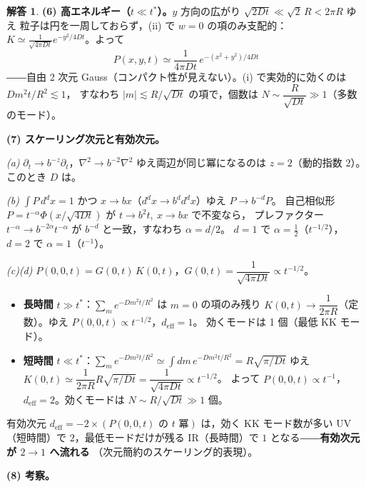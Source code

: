 \documentclass[dvipdfmx, uplatex]{jsarticle}
\theoremstyle{definition}
\newtheorem*{sol}{解答}
\begin{document}
\begin{sol}
\par\smallskip
\textbf{(6) 高エネルギー（$t\ll t^\ast$）。}$y$ 方向の広がり $\sqrt{2Dt}\ll\sqrt{2}\,R<2\pi R$ ゆえ
粒子は円を一周しておらず，(ii) で $\boxed{w=0}$ の項のみ支配的：
$K\simeq\frac{1}{\sqrt{4\pi Dt}}e^{-y^2/4Dt}$。よって
\[
    \boxed{\,P(x,y,t)\simeq\frac{1}{4\pi Dt}\,e^{-(x^2+y^2)/4Dt}\,}
\]
――自由 2 次元 Gauss（コンパクト性が見えない）。(i) で実効的に効くのは $Dm^2t/R^2\lesssim1$，
すなわち $|m|\lesssim R/\sqrt{Dt}$ の項で，個数は $\boxed{N\sim\dfrac{R}{\sqrt{Dt}}\gg1}$（多数のモード）。

\par\smallskip
\textbf{(7) スケーリング次元と有効次元。}

\textit{(a)} $\partial_t\to b^{-z}\partial_t$，$\nabla^2\to b^{-2}\nabla^2$ ゆえ両辺が同じ冪になるのは
$\boxed{z=2}$（動的指数 $2$）。このとき $D$ は。

\textit{(b)} $\int P\,d^dx=1$ かつ $x\to bx$（$d^dx\to b^d d^dx$）ゆえ $\boxed{P\to b^{-d}P}$。
自己相似形 $P=t^{-\alpha}\Phi(x/\sqrt{4Dt})$ が $t\to b^2t,\ x\to bx$ で不変なら，
プレファクター $t^{-\alpha}\to b^{-2\alpha}t^{-\alpha}$ が $b^{-d}$ と一致，すなわち $\boxed{\alpha=d/2}$。
$d=1$ で $\alpha=\tfrac12$（$t^{-1/2}$），$d=2$ で $\alpha=1$（$t^{-1}$）。

\textit{(c)(d)} $P(0,0,t)=G(0,t)\,K(0,t)$，$G(0,t)=\dfrac{1}{\sqrt{4\pi Dt}}\propto t^{-1/2}$。
\begin{itemize}
\item[$\bullet$] \textbf{長時間} $t\gg t^\ast$：$\sum_m e^{-Dm^2t/R^2}$ は $\boxed{m=0}$ の項のみ残り
$K(0,t)\to\dfrac{1}{2\pi R}$（定数）。ゆえ $P(0,0,t)\propto\boxed{t^{-1/2}}$，$\boxed{d_{\mathrm{eff}}=1}$。
効くモードは 1 個（最低 KK モード）。
\item[$\bullet$] \textbf{短時間} $t\ll t^\ast$：$\displaystyle\sum_m e^{-Dm^2t/R^2}\simeq\int dm\,e^{-Dm^2t/R^2}
=R\sqrt{\pi/Dt}$ ゆえ $K(0,t)\simeq\dfrac{1}{2\pi R}R\sqrt{\pi/Dt}=\dfrac{1}{\sqrt{4\pi Dt}}\propto t^{-1/2}$。
よって $P(0,0,t)\propto\boxed{t^{-1}}$，$\boxed{d_{\mathrm{eff}}=2}$。効くモードは $N\sim R/\sqrt{Dt}\gg1$ 個。
\end{itemize}
有効次元 $d_{\mathrm{eff}}=-2\times(\text{$P(0,0,t)$ の $t$ 冪})$ は，効く KK モード数が多い UV（短時間）で
$2$，最低モードだけが残る IR（長時間）で $1$ となる――\textbf{有効次元が $2\to1$ へ流れる}
（次元簡約のスケーリング的表現）。

\par\smallskip
\textbf{(8) 考察。}


\end{sol}
\end{document}
